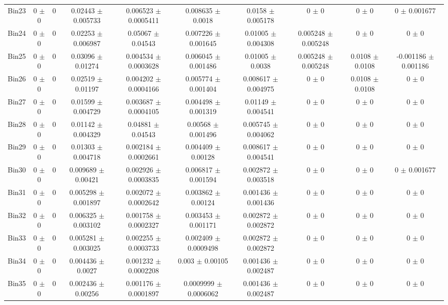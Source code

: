 \begin{tabular}{@{\extracolsep{4pt}}lccccccccc@{}}
     Bin23 & 0 $\pm$ 0 & 0 & 0.02443 $\pm$ 0.005733 & 0.006523 $\pm$ 0.0005411 & 0.008635 $\pm$ 0.0018 & 0.0158 $\pm$ 0.005178 & 0 $\pm$ 0 & 0 $\pm$ 0 & 0 $\pm$ 0.001677 \\ 
     Bin24 & 0 $\pm$ 0 & 0 & 0.02253 $\pm$ 0.006987 & 0.05067 $\pm$ 0.04543 & 0.007226 $\pm$ 0.001645 & 0.01005 $\pm$ 0.004308 & 0.005248 $\pm$ 0.005248 & 0 $\pm$ 0 & 0 $\pm$ 0 \\ 
     Bin25 & 0 $\pm$ 0 & 0 & 0.03096 $\pm$ 0.01274 & 0.004534 $\pm$ 0.0003628 & 0.006045 $\pm$ 0.001486 & 0.01005 $\pm$ 0.0038 & 0.005248 $\pm$ 0.005248 & 0.0108 $\pm$ 0.0108 & -0.001186 $\pm$ 0.001186 \\ 
     Bin26 & 0 $\pm$ 0 & 0 & 0.02519 $\pm$ 0.01197 & 0.004202 $\pm$ 0.0004166 & 0.005774 $\pm$ 0.001404 & 0.008617 $\pm$ 0.004975 & 0 $\pm$ 0 & 0.0108 $\pm$ 0.0108 & 0 $\pm$ 0 \\ 
     Bin27 & 0 $\pm$ 0 & 0 & 0.01599 $\pm$ 0.004729 & 0.003687 $\pm$ 0.0004105 & 0.004498 $\pm$ 0.001319 & 0.01149 $\pm$ 0.004541 & 0 $\pm$ 0 & 0 $\pm$ 0 & 0 $\pm$ 0 \\ 
     Bin28 & 0 $\pm$ 0 & 0 & 0.01142 $\pm$ 0.004329 & 0.04881 $\pm$ 0.04543 & 0.00568 $\pm$ 0.001496 & 0.005745 $\pm$ 0.004062 & 0 $\pm$ 0 & 0 $\pm$ 0 & 0 $\pm$ 0 \\ 
     Bin29 & 0 $\pm$ 0 & 0 & 0.01303 $\pm$ 0.004718 & 0.002184 $\pm$ 0.0002661 & 0.004409 $\pm$ 0.00128 & 0.008617 $\pm$ 0.004541 & 0 $\pm$ 0 & 0 $\pm$ 0 & 0 $\pm$ 0 \\ 
     Bin30 & 0 $\pm$ 0 & 0 & 0.009689 $\pm$ 0.00421 & 0.002926 $\pm$ 0.0003835 & 0.006817 $\pm$ 0.001594 & 0.002872 $\pm$ 0.003518 & 0 $\pm$ 0 & 0 $\pm$ 0 & 0 $\pm$ 0.001677 \\ 
     Bin31 & 0 $\pm$ 0 & 0 & 0.005298 $\pm$ 0.001897 & 0.002072 $\pm$ 0.0002642 & 0.003862 $\pm$ 0.00124 & 0.001436 $\pm$ 0.001436 & 0 $\pm$ 0 & 0 $\pm$ 0 & 0 $\pm$ 0 \\ 
     Bin32 & 0 $\pm$ 0 & 0 & 0.006325 $\pm$ 0.003102 & 0.001758 $\pm$ 0.0002327 & 0.003453 $\pm$ 0.001171 & 0.002872 $\pm$ 0.002872 & 0 $\pm$ 0 & 0 $\pm$ 0 & 0 $\pm$ 0 \\ 
     Bin33 & 0 $\pm$ 0 & 0 & 0.005281 $\pm$ 0.003025 & 0.002255 $\pm$ 0.0003733 & 0.002409 $\pm$ 0.0009498 & 0.002872 $\pm$ 0.002872 & 0 $\pm$ 0 & 0 $\pm$ 0 & 0 $\pm$ 0 \\ 
     Bin34 & 0 $\pm$ 0 & 0 & 0.004436 $\pm$ 0.0027 & 0.001232 $\pm$ 0.0002208 & 0.003 $\pm$ 0.00105 & 0.001436 $\pm$ 0.002487 & 0 $\pm$ 0 & 0 $\pm$ 0 & 0 $\pm$ 0 \\ 
     Bin35 & 0 $\pm$ 0 & 0 & 0.002436 $\pm$ 0.00256 & 0.001176 $\pm$ 0.0001897 & 0.0009999 $\pm$ 0.0006062 & 0.001436 $\pm$ 0.002487 & 0 $\pm$ 0 & 0 $\pm$ 0 & 0 $\pm$ 0 \\ 

\end{tabular}
